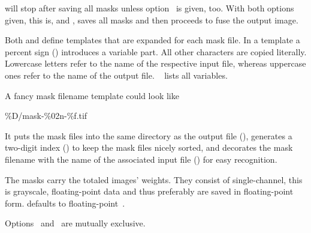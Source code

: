 \begin{codelist}
    \App{} will stop after saving all masks unless
    option~ is given, too.  With both options given,
    this is,  and , \App{} saves all masks and then
    proceeds to fuse the output image.

    Both  and 
    define templates that are expanded for each mask file.  In a template a percent sign
    (\sample{\%}) introduces a variable part.  All other characters are copied literally.
    Lowercase letters refer to the name of the respective input file, whereas uppercase ones
    refer to the name of the output file.  \tableName~
    lists all variables.

    A fancy mask filename template could look like
    \begin{literal}
      \%D/mask-\%02n-\%f.tif
    \end{literal}
    It puts the mask files into the same directory as the output file (), generates
    a two-digit index () to keep the mask files nicely sorted, and decorates the
    mask filename with the name of the associated input file () for easy
    recognition.

    The masks carry the totaled images' weights.  They consist of single-channel, this is
    grayscale, floating-point data and thus preferably are saved in floating-point form.  \App{}
    defaults to floating-point~.

    Options~ and~ are mutually exclusive.
\fi
\end{codelist}


\ifenfuse
  
\fi



